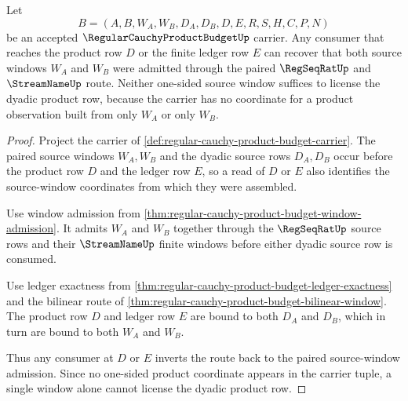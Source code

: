 \begin{theorem}
\label{thm:regular-cauchy-product-budget-symmetric-source-window-inversion}
Let
$$
B=(A,B,W_A,W_B,D_A,D_B,D,E,R,S,H,C,P,N)
$$
be an accepted $\RegularCauchyProductBudgetUp$ carrier. Any consumer that reaches the product row $D$ or the finite ledger row $E$ can recover that both source windows $W_A$ and $W_B$ were admitted through the paired $\RegSeqRatUp$ and $\StreamNameUp$ route. Neither one-sided source window suffices to license the dyadic product row, because the carrier has no coordinate for a product observation built from only $W_A$ or only $W_B$.
\end{theorem}
\begin{proof}
Project the carrier of \autoref{def:regular-cauchy-product-budget-carrier}. The paired source windows $W_A,W_B$ and the dyadic source rows $D_A,D_B$ occur before the product row $D$ and the ledger row $E$, so a read of $D$ or $E$ also identifies the source-window coordinates from which they were assembled.

Use window admission from \autoref{thm:regular-cauchy-product-budget-window-admission}. It admits $W_A$ and $W_B$ together through the $\RegSeqRatUp$ source rows and their $\StreamNameUp$ finite windows before either dyadic source row is consumed.

Use ledger exactness from \autoref{thm:regular-cauchy-product-budget-ledger-exactness} and the bilinear route of \autoref{thm:regular-cauchy-product-budget-bilinear-window}. The product row $D$ and ledger row $E$ are bound to both $D_A$ and $D_B$, which in turn are bound to both $W_A$ and $W_B$.

Thus any consumer at $D$ or $E$ inverts the route back to the paired source-window admission. Since no one-sided product coordinate appears in the carrier tuple, a single window alone cannot license the dyadic product row.
\end{proof}

